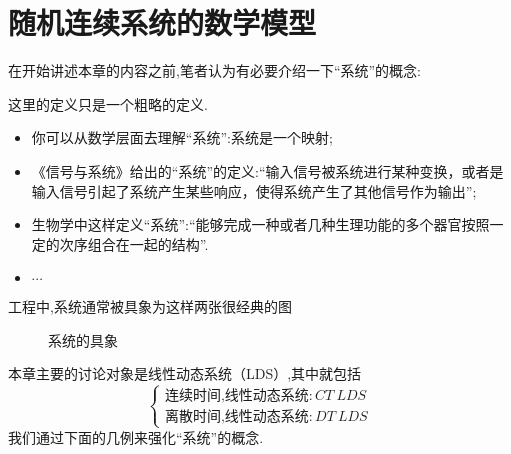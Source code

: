 \documentclass[cn,10pt,citestyle=gb7714-2015,bibstyle=gb7714-2015]{elegantbook}
\begin{document}
\section{随机连续系统的数学模型}
在开始讲述本章的内容之前,笔者认为有必要介绍一下“系统”的概念:
\begin{definition}\label{def:system}
  这里的定义只是一个粗略的定义.
  \begin{itemize}
    \item 你可以从数学层面去理解“系统”:系统是一个映射;
    \item 《信号与系统》给出的“系统”的定义:“输入信号被系统进行某种变换，或者是输入信号引起了系统产生某些响应，使得系统产生了其他信号作为输出”;
    \item 生物学中这样定义“系统”:“能够完成一种或者几种生理功能的多个器官按照一定的次序组合在一起的结构”.
    \item $\cdots$
  \end{itemize}
  工程中,系统通常被具象为这样两张很经典的图
  \begin{figure}[H]
    \centering
    \hspace{1em}
    \caption{系统的具象}
  \end{figure}
\end{definition}
本章主要的讨论对象是\colorbox{yellow!20}{线性动态系统}（LDS）,其中就包括
\[
    \begin{cases}
      \text{连续时间,线性动态系统}:CT\ LDS\\
      \text{离散时间,线性动态系统}:DT\ LDS
    \end{cases}
\]我们通过下面的几例来强化“系统”的概念.
\end{document}
